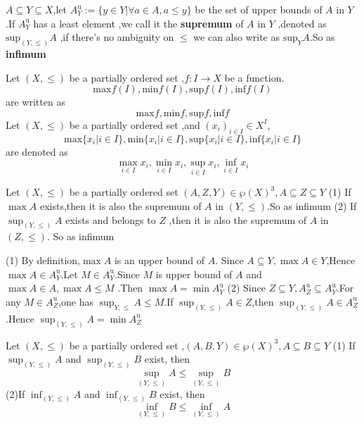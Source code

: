 \documentclass{book}
\numberwithin{equation}{section}
\begin{document}
\begin{definitionenv}
    $A\subseteq Y\subseteq X$,let $A_Y^\mathrm{u}:=\{y\in Y|\forall a\in A,a\le y\}$ be the set of upper bounds of $A$ in $Y$.If $A_Y^\mathrm{u}$ has a least element ,we call it the \textbf{supremum} of $A$ in $Y$ ,denoted as $\mathrm{sup}_{(Y,\le)}A$ ,if there's no ambiguity on $\le$ we can also write as $\mathrm{sup}_{Y}A$.So as \textbf{infimum}
\end{definitionenv}
\begin{notationenv}\label{notation4.5.1}
    
         Let $(X,\le)$ be a partially ordered set ,$f:I\rightarrow X$ be a function.$$\mathrm{max}f(I),\mathrm{min}f(I),\mathrm{sup}f(I),\mathrm{inf}f(I)$$ are written as $$\mathrm{max}f,\mathrm{min}f,\mathrm{sup}f,\mathrm{inf}f$$
         Let $(X,\le)$ be a partially ordered set ,and $(x_i)_{i\in I}\in X^I$,$$\mathrm{max}\{x_i|i\in I\},\mathrm{min}\{x_i|i\in I\},\mathrm{sup}\{x_i|i\in I\},\mathrm{inf}\{x_i|i\in I\}$$ are denoted as $$\max _{i\in I}x_i,\min _{i\in I}x_i,\sup _{i\in I}x_i,\inf _{i\in I}x_i$$
    
\end{notationenv}
\begin{propositionenv}\label{proposition4.5.1}
    \quad
    \newline
    Let $(X,\le)$ be a partially ordered set $(A,Z,Y)\in \wp (X)^3,A\subseteq Z\subseteq Y$
    \newline
   (1) If $\max A$ exists,then it is also the supremum of $A$ in $(Y,\le)$.So as infimum
    \newline
    (2) If $\sup_{(Y,\le)}A$ exists and belongs to $Z$ ,then it is also the supremum of $A$ in $(Z,\le)$. So as infimum
\end{propositionenv}
\begin{proofenv}
    \quad \newline
   (1) By definition,$\max A $ is an upper bound of $A$. Since $A\subseteq Y, \max A \in Y$,Hence $\max A\in A_Y^\mathrm{u}$.Let $M\in A_Y^\mathrm{u} $.Since $M$ is upper bound of $A$ and $\max A\in A,\max A\le M$ .Then $\max A=\min A_Y^\mathrm{u}$
\newline
(2) Since $Z\subseteq Y,A_Z^\mathrm{u}\subseteq A_Y^\mathrm{u}$.For any $M\in A_Z^\mathrm{u}$,one has $\sup _{Y,\le}A\le M$.If $\sup_{(Y,\le)}A\in Z$,then $\sup_{(Y,\le)}A\in A_Z^\mathrm{u}$.Hence $\sup _{(Y,\le)}A=\min A_Z^\mathrm{u}$
\end{proofenv}
\begin{propositionenv}\label{proposition4.5.2}
    \quad
    \newline
    Let $(X,\le )$ be a partially ordered set ,$(A,B,Y)\in \wp (X)^3,A\subseteq B\subseteq Y$
    \newline
    (1) If $\sup_{(Y,\le)}A$ and $\sup_{(Y,\le)}B$ exist, then $$\sup_{(Y,\le)}A \le \sup_{(Y,\le)}B$$
    \newline
    (2)If $\inf_{(Y,\le)}A$ and $\inf_{(Y,\le)}B$ exist, then $$\inf_{(Y,\le)}B \le \inf_{(Y,\le)}A$$
    
\end{propositionenv}
\end{document}
